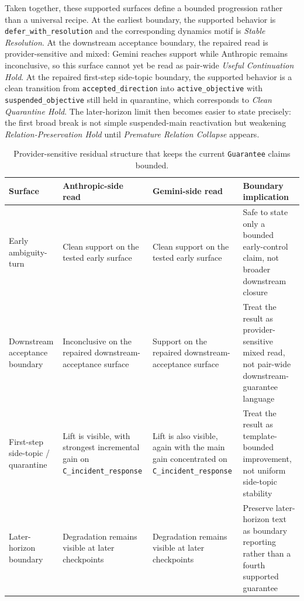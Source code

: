 \documentclass[11pt]{article}
\begin{document}
Taken together, these supported surfaces define a bounded progression rather than
a universal recipe. At the earliest boundary, the supported behavior is
\texttt{defer\_with\_resolution} and the corresponding dynamics motif is
\textit{Stable Resolution}. At the downstream acceptance boundary, the repaired
read is provider-sensitive and mixed: Gemini reaches support while Anthropic
remains inconclusive, so this surface cannot yet be read as pair-wide
\textit{Useful Continuation Hold}. At the repaired first-step
side-topic boundary, the supported behavior is a clean transition from
\texttt{accepted\_direction} into \texttt{active\_objective} with
\texttt{suspended\_objective} still held in quarantine, which corresponds to
\textit{Clean Quarantine Hold}. The later-horizon limit then becomes easier to
state precisely: the first broad break is not simple suspended-main reactivation
but weakening \textit{Relation-Preservation Hold} until \textit{Premature
Relation Collapse} appears.

\begin{table}[ht]
\centering
\begin{tabular}{|p{}|p{}|p{}|p{}|}
\hline
\textbf{Surface} & \textbf{Anthropic-side read} & \textbf{Gemini-side read} & \textbf{Boundary implication} \\
\hline
Early ambiguity-turn & Clean support on the tested early surface & Clean support on the tested early surface & Safe to state only a bounded early-control claim, not broader downstream closure \\
\hline
Downstream acceptance boundary & Inconclusive on the repaired downstream-acceptance surface & Support on the repaired downstream-acceptance surface & Treat the result as provider-sensitive mixed read, not pair-wide downstream-guarantee language \\
\hline
First-step side-topic / quarantine & Lift is visible, with strongest incremental gain on \texttt{C\_incident\_response} & Lift is also visible, again with the main gain concentrated on \texttt{C\_incident\_response} & Treat the result as template-bounded improvement, not uniform side-topic stability \\
\hline
Later-horizon boundary & Degradation remains visible at later checkpoints & Degradation remains visible at later checkpoints & Preserve later-horizon text as boundary reporting rather than a fourth supported guarantee \\
\hline
\end{tabular}
\caption{Provider-sensitive residual structure that keeps the current
\texttt{Guarantee} claims bounded.}
\end{table}
\end{document}
